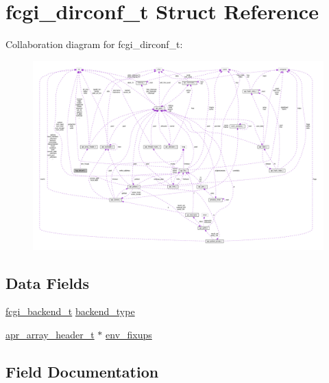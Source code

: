 \hypertarget{structfcgi__dirconf__t}{}\section{fcgi\+\_\+dirconf\+\_\+t Struct Reference}
\label{structfcgi__dirconf__t}


Collaboration diagram for fcgi\+\_\+dirconf\+\_\+t\+:
\nopagebreak
\begin{figure}[H]
\begin{center}
\leavevmode
\includegraphics[width=350pt]{structfcgi__dirconf__t__coll__graph}
\end{center}
\end{figure}
\subsection*{Data Fields}
\begin{DoxyCompactItemize}
\item 
\hyperlink{mod__proxy__fcgi_8c_accab320388074e5f443cfe2738d2beaf}{fcgi\+\_\+backend\+\_\+t} \hyperlink{structfcgi__dirconf__t_a86ac17987b9273fee61599b962112169}{backend\+\_\+type}
\item 
\hyperlink{structapr__array__header__t}{apr\+\_\+array\+\_\+header\+\_\+t} $\ast$ \hyperlink{structfcgi__dirconf__t_a7da066992e5c7fd108b0acbb43f8a8da}{env\+\_\+fixups}
\end{DoxyCompactItemize}


\subsection{Field Documentation}
